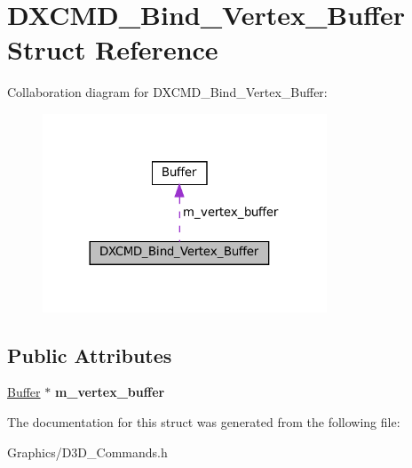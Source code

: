 \hypertarget{structDXCMD__Bind__Vertex__Buffer}{}\section{D\+X\+C\+M\+D\+\_\+\+Bind\+\_\+\+Vertex\+\_\+\+Buffer Struct Reference}
\label{structDXCMD__Bind__Vertex__Buffer}


Collaboration diagram for D\+X\+C\+M\+D\+\_\+\+Bind\+\_\+\+Vertex\+\_\+\+Buffer\+:
\nopagebreak
\begin{figure}[H]
\begin{center}
\leavevmode
\includegraphics[width=240pt]{structDXCMD__Bind__Vertex__Buffer__coll__graph}
\end{center}
\end{figure}
\subsection*{Public Attributes}
\begin{DoxyCompactItemize}
\item 
\mbox{\label{structDXCMD__Bind__Vertex__Buffer_ada6d4b918d2d7fad1bfdbb94bb8064f4}} 
\hyperlink{classBuffer}{Buffer} $\ast$ {\bfseries m\+\_\+vertex\+\_\+buffer}
\end{DoxyCompactItemize}


The documentation for this struct was generated from the following file\+:\begin{DoxyCompactItemize}
\item 
Graphics/D3\+D\+\_\+\+Commands.\+h\end{DoxyCompactItemize}
